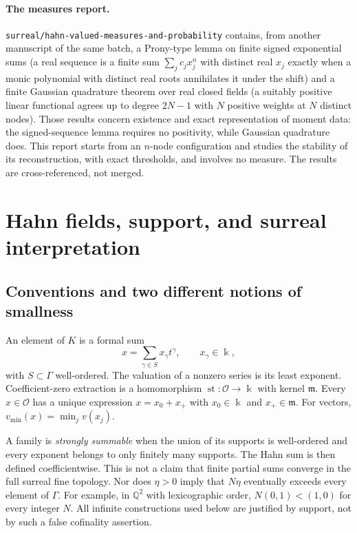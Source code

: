 \documentclass[11pt,letterpaper]{article}
\theoremstyle{definition}
\theoremstyle{remark}
\newcommand{\Q}{\mathbb Q}
\newcommand{\Ocal}{\mathcal O}
\newcommand{\mfr}{\mathfrak m}
\newcommand{\st}{\operatorname{st}}
\newcommand{\lbl}[1]{\nolinkurl{#1}}%
\begin{document}
\paragraph{The measures report.}
\lbl{surreal/hahn-valued-measures-and-probability} \cite{RepoMeas}
contains, from another manuscript of the same batch, a Prony-type lemma on
finite signed exponential sums (a real sequence is a finite sum
$\sum_jc_jx_j^n$ with distinct real $x_j$ exactly when a monic polynomial
with distinct real roots annihilates it under the shift) and a finite Gaussian
quadrature theorem over real closed fields (a suitably positive linear
functional agrees up to degree $2N-1$ with $N$ positive weights at $N$
distinct nodes). Those results concern existence and exact representation of
moment data: the signed-sequence lemma requires no positivity, while
Gaussian quadrature does. This report starts from an $n$-node
configuration and studies the stability of its reconstruction, with exact
thresholds, and involves no measure. The results are cross-referenced, not
merged.

\section{Hahn fields, support, and surreal interpretation}
\label{prony:sec:hahn}

\subsection{Conventions and two different notions of smallness}
An element of $K$ is a formal sum
\[
 x=\sum_{\gamma\in S}x_\gamma t^\gamma,
 \qquad x_\gamma\in\Bbbk,
\]
with $S\subset\Gamma$ well-ordered. The valuation of a nonzero series is
its least exponent. Coefficient-zero extraction is a homomorphism
$\st:\Ocal\to\Bbbk$ with kernel $\mfr$. Every $x\in\Ocal$ has a unique
expression $x=x_0+x_+$ with $x_0\in\Bbbk$ and $x_+\in\mfr$.
For vectors, $v_{\min}(x)=\min_jv(x_j)$.

A family is \emph{strongly summable} when the union of its supports is
well-ordered and every exponent belongs to only finitely many supports.
The Hahn sum is then defined coefficientwise. This is not a claim that
finite partial sums converge in the full surreal fine topology. Nor does
$\eta>0$ imply that $N\eta$ eventually exceeds every element of $\Gamma$.
For example, in $\Q^2$ with lexicographic order, $N(0,1)<(1,0)$ for every
integer $N$. All infinite constructions used below are justified by support,
not by such a false cofinality assertion.
\end{document}
